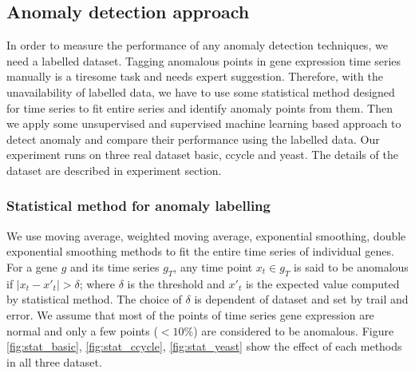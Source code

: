 \subsection{Anomaly detection approach}

In order to measure the performance of any anomaly detection techniques, we need a labelled dataset. Tagging anomalous points in gene expression time series manually is a tiresome task and needs expert suggestion. Therefore, with the unavailability of labelled data, we have to use some statistical method designed for time series to fit entire series and identify anomaly points from them. Then we apply some unsupervised and supervised machine learning based approach to detect anomaly and compare their performance using the labelled data. Our experiment runs on three real dataset basic, ccycle and yeast. The details of the dataset are described in experiment section. 

\subsubsection{Statistical method for anomaly labelling}
We use moving average, weighted moving average, exponential smoothing, double exponential smoothing methods to fit the entire time series of individual genes. For a gene $g$ and its time series $g_T$, any time point $x_t \in g_T$ is said to be anomalous if $|x_t-x'_t|> \delta$; where $\delta$ is the threshold and $x'_t$ is the expected value computed by statistical method. The choice of $\delta$ is dependent of dataset and set by trail and error. We assume that most of the points of time series gene expression are normal and only a few points ($<10\%$) are considered to be anomalous. Figure \ref{fig:stat_basic}, \ref{fig:stat_ccycle}, \ref{fig:stat_yeast} show the effect of each methods in all three dataset.

